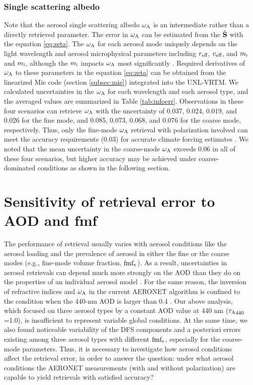 \subsubsection{Single scattering albedo}

Note that the aerosol single scattering albedo $\omega_\text{A}$ is an intermediate rather
than a directly retrieved parameter. The error in $\omega_\text{A}$ can be estimated
from the $\hat{\mathbf{S}}$ with the equation \eqref{eq:zeta}. The $\omega_\text{A}$ for each
aerosol mode uniquely depends on the light wavelength and aerosol 
microphysical parameters including $r_\text{eff}$, $v_\text{eff}$, and $m_\text{r}$ and $m_\text{i}$,
although the $m_\text{i}$ impacts $\omega_\text{A}$ most significantly \citep{Hansen74}.
Required derivatives of $\omega_\text{A}$ to these parameters in the equation
\eqref{eq:zeta} can be obtained from the linearized Mie code (section
\ref{subsec:mie}) integrated into the UNL-VRTM. We calculated uncertainties 
in the $\omega_\text{A}$ for each wavelength and each aerosol type, and the averaged 
values are summarized in Table \ref{tab:infoerr}. Observations in these four 
scenarios can  retrieve $\omega_\text{A}$ with the uncertainty of 0.037, 0.024, 0.019, 
and 0.026 for  the fine mode, and 0.085, 0.073, 0.068, and 0.076 for the coarse
mode, respectively. Thus, only the fine-mode $\omega_\text{A}$ retrieval with polarization
involved can meet the accuracy requirements (0.03) for accurate climate forcing
estimates \citep{Mishchenko04}. We noted that the mean uncertainty in the
coarse-mode $\omega_\text{A}$ exceeds 0.06 in all of these four scenarios, but higher
accuracy may be achieved under coarse-dominated conditions as shown in the
following section.  

\section{Sensitivity of retrieval error to AOD and fmf} \label{sec:infosensi}

The performance of retrieval usually varies with aerosol conditions like
the aerosol loading and the prevalence of aerosol in either the fine or
the coarse modes (e.g., fine-mode volume fraction, $\text{fmf}_\text{v}$). As a result,
uncertainties in aerosol retrievals can depend much more strongly on the
AOD than they do on the properties of an individual aerosol model
\citep{Knobelspiesse12}. For the same reason, the inversion of
refractive indices and $\omega_\text{A}$ in the current AERONET algorithm is confined
to the condition when the 440-nm AOD is larger than 0.4
\citep{Dubovik00b, Holben06}. Our above analysis, which focused on three
aerosol types by a constant AOD value at 440 nm (${\tau_\text{A}}_{440}$=1.0), is
insufficient to represent variable global conditions. At the same time,
we also found noticeable variability of the DFS components and a
posteriori errors existing among three aerosol types with different
$\text{fmf}_\text{v}$, especially for the coarse-mode parameters. Thus, it is necessary
to investigate how aerosol conditions affect the retrieval error, in
order to answer the question: under what aerosol conditions the AERONET
measurements (with and without polarization) are capable to yield
retrievals with satisfied accuracy?

